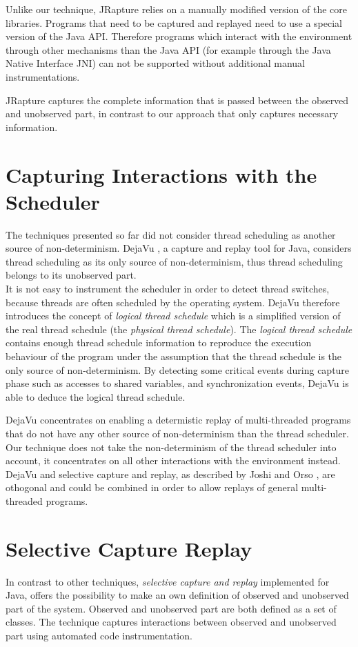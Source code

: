 Unlike our technique, JRapture relies on a manually modified version of the core libraries. Programs that need to be captured and replayed need to use a special version of the Java API.  Therefore programs which interact with the environment through other mechanisms than the Java API (for example through the Java Native Interface JNI) can not be supported without additional manual instrumentations.

JRapture captures the complete information that is passed between the observed and unobserved part, in contrast to our approach that only captures necessary information.

\section {Capturing Interactions with the Scheduler}
The techniques presented so far did not consider thread scheduling as another source of non-determinism. DejaVu \cite{dejavu}, a capture and replay tool for Java, considers thread scheduling as its only source of non-determinism, thus thread scheduling belongs to its unobserved part.\\
It is not easy to instrument the scheduler in order to detect thread switches, because threads are often scheduled by the operating system. DejaVu therefore introduces the concept of \emph{logical thread schedule} which is a simplified version of the real thread schedule (the \emph{physical thread schedule}). The \emph{logical thread schedule} contains enough thread schedule information to reproduce the execution behaviour of the program under the assumption that the thread schedule is the only source of non-determinism. By detecting some critical events during capture phase such as accesses to shared variables, and synchronization events, DejaVu is able to deduce the logical thread schedule.

DejaVu concentrates on enabling a determistic replay of multi-threaded programs that do not have any other source of non-determinism than the thread scheduler. Our technique does not take the non-determinism of the thread scheduler into account, it concentrates on all other interactions with the environment instead. DejaVu and selective capture and replay, as described by Joshi and Orso \cite{orso05may, orso06}, are othogonal and could be combined in order to allow replays of general multi-threaded programs. 

\section{Selective Capture Replay}
In contrast to other techniques, \emph{selective capture and replay} \cite{orso05may} implemented for Java, offers the possibility to make an own definition of observed and unobserved part of the system. Observed and unobserved part are both defined as a set of classes. The technique captures interactions between observed and unobserved part using automated code instrumentation.

